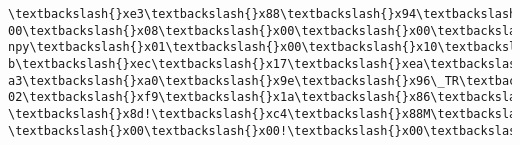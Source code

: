 \documentclass[11pt]{article}
\begin{document}
\begin{Verbatim}[commandchars=\\\{\}]
\textbackslash{}xe3\textbackslash{}x88\textbackslash{}x94\textbackslash{}x87\textbackslash{}xb6\textbackslash{}xc8\textbackslash{}n\textbackslash{}x0e\textbackslash{}x8d\textbackslash{}x15\textbackslash{}xda\textbackslash{}x9aJi\textbackslash{}xf1\textbackslash{}x05PK\textbackslash{}x03\textbackslash{}x04\textbackslash{}x14\textbackslash{}x00\textbackslash{}x00\textbackslash{}x
00\textbackslash{}x08\textbackslash{}x00\textbackslash{}x00\textbackslash{}x00!\textbackslash{}x00\textbackslash{}xfb!\textbackslash{}xf8\textbackslash{}xe6e\textbackslash{}x00\textbackslash{}x00\textbackslash{}x00a\textbackslash{}x01\textbackslash{}x00\textbackslash{}x00\textbackslash{}x05\textbackslash{}x00\textbackslash{}x14\textbackslash{}x00P.
npy\textbackslash{}x01\textbackslash{}x00\textbackslash{}x10\textbackslash{}x00a\textbackslash{}x01\textbackslash{}x00\textbackslash{}x00\textbackslash{}x00\textbackslash{}x00\textbackslash{}x00\textbackslash{}x00e\textbackslash{}x00\textbackslash{}x00\textbackslash{}x00\textbackslash{}x00\textbackslash{}x00\textbackslash{}x00\textbackslash{}x00\textbackslash{}x9
b\textbackslash{}xec\textbackslash{}x17\textbackslash{}xea\textbackslash{}x1b\textbackslash{}x10\textbackslash{}xc9\textbackslash{}xc8P\textbackslash{}xc6P\textbackslash{}xad\textbackslash{}x9e\textbackslash{}x92Z\textbackslash{}x9c\textbackslash{}\textbackslash{}\textbackslash{}xa4n\textbackslash{}xa5\textbackslash{}xa0\^{}Sj\textbackslash{}xa8\textbackslash{}xae\textbackslash{}x
a3\textbackslash{}xa0\textbackslash{}x9e\textbackslash{}x96\_TR\textbackslash{}x94\textbackslash{}x98\textbackslash{}x17\textbackslash{}x9f\_\textbackslash{}x94\textbackslash{}x92\textbackslash{}n\textbackslash{}x12wK\textbackslash{}xcc)N\textbackslash{}x05\textbackslash{}x8a\textbackslash{}x17g\$\textbackslash{}x16\textbackslash{}xa4\textbackslash{}x
02\textbackslash{}xf9\textbackslash{}x1a\textbackslash{}x86\textbackslash{}xa6:\textbackslash{}n\textbackslash{}x86\textbackslash{}xa6\textbackslash{}x9a:\textbackslash{}n\textbackslash{}xb5\textbackslash{}nd\textbackslash{}x02.\textbackslash{}x06\textbackslash{}x08`d\textbackslash{}x80\textbackslash{}x03\$\&2`\textbackslash{}xc4-
\textbackslash{}x8d!\textbackslash{}xc4\textbackslash{}x88M\textbackslash{}x94dsqh@\textbackslash{}x15\textbackslash{}xc7e\textbackslash{}x0b\textbackslash{}\textbackslash{}\textbackslash{}x1c\textbackslash{}x00PK\textbackslash{}x03\textbackslash{}x04\textbackslash{}x14\textbackslash{}x00\textbackslash{}x00\textbackslash{}x00\textbackslash{}x08\textbackslash{}x00
\textbackslash{}x00\textbackslash{}x00!\textbackslash{}x00\textbackslash{}x11b\textbackslash{}x9c\textbackslash{}xe8\textbackslash{}x90\textbackslash{}x00\textbackslash{}x00\textbackslash{}x00\textbackslash{}xd1\textbackslash{}x00\textbackslash{}x00\textbackslash{}x00\textbackslash{}x08\textbackslash{}x00\textbackslash{}x14\textbackslash{}x00Sinv.n

\end{Verbatim}
\end{document}
